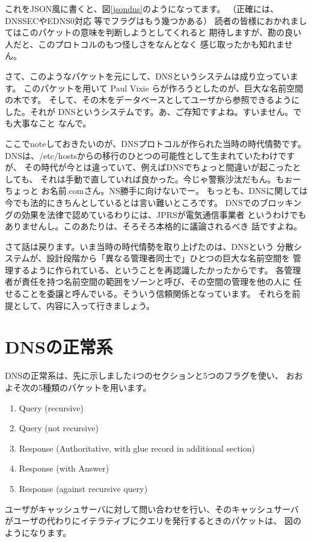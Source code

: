 これをJSON風に書くと、図\ref{jsondns}のようになってます。
（正確には、DNSSECやEDNS0対応
等でフラグはもう幾つかある）
読者の皆様におかれましてはこのパケットの意味を判断しようとしてくれると
期待しますが、勘の良い人だと、このプロトコルのもつ怪しさをなんとなく
感じ取ったかも知れません。

さて、このようなパケットを元にして、DNSというシステムは成り立っています。
このパケットを用いて Paul Vixie らが作ろうとしたのが、巨大な名前空間の木です。
そして、その木をデータベースとしてユーザから参照できるようにした。それが
DNSというシステムです。あ、ご存知ですよね。すいません。でも大事なこと
なんで。

ここでnoteしておきたいのが、DNSプロトコルが作られた当時の時代情勢です。
DNSは、/etc/hostsからの移行のひとつの可能性として生まれていたわけですが、
その時代が今とは違っていて、例えばDNSでちょっと間違いが起こったとしても、
それは手動で直していれば良かった。今じゃ警察沙汰だもん。もぉーちょっと
お名前.comさん。NS勝手に向けないでー。
もっとも、DNSに関しては今でも法的にきちんとしているとは言い難いところです。
DNSでのブロッキングの効果を法律で認めているわりには、JPRSが電気通信事業者
というわけでもありませんし。このあたりは、そろそろ本格的に議論されるべき
話ですよね。

さて話は戻ります。いま当時の時代情勢を取り上げたのは、DNSという
分散システムが、設計段階から「異なる管理者同士で」ひとつの巨大な名前空間を
管理するように作られている、ということを再認識したかったからです。
各管理者が責任を持つ名前空間の範囲をゾーンと呼び、その空間の管理を他の人に
任せることを委譲と呼んでいる。そういう信頼関係となっています。
それらを前提として、内容に入って行きましょう。


\section {DNSの正常系}

DNSの正常系は、先に示しました4つのセクションと5つのフラグを使い、
おおよそ次の5種類のパケットを用います。
\begin{enumerate}
  \item Query (recursive)
  \item Query (not recursive)
  \item Response (Authoritative, with glue record in additional section)
  \item Response (with Answer)
  \item Response (against recursive query)
\end{enumerate}

ユーザがキャッシュサーバに対して問い合わせを行い、そのキャッシュサーバ
がユーザの代わりにイテラティブにクエリを発行するときのパケットは、
図のようになります。

